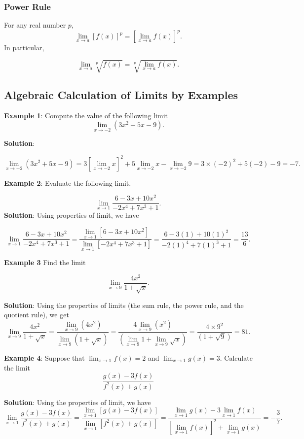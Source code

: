 \documentclass[
]{book}
\begin{document}
\hypertarget{power-rule}{%
\subsubsection{Power Rule}\label{power-rule}}

For any real number \(p\),
\[
\lim_{x\to a}[f(x)]^p = [\lim_{x\to a}f(x)]^p.
\]
In particular,

\[
\lim_{x\to a}\sqrt[p]{f(x)} = \sqrt[p]{\lim_{x\to a}f(x)}.
\]

\hypertarget{algebraic-calculation-of-limits-by-examples}{%
\subsection{Algebraic Calculation of Limits by Examples}\label{algebraic-calculation-of-limits-by-examples}}

\textbf{Example 1}: Compute the value of the following limit
\[
\lim_{x\to -2}(3x^2 + 5x -9).
\]

\textbf{Solution}:

\[
\lim_{x\to -2}(3x^2 + 5x -9) = 3[\lim_{x\to -2} x]^2 + 5\lim_{x\to -2}x - \lim_{x\to -2}9 = 3\times (-2)^2 + 5(-2) - 9 = -7.
\]

\textbf{Example 2}: Evaluate the following limit.

\[
\lim_{x\to 1}\frac{6-3x+10x^2}{-2x^4+7x^3+1}.
\]
\textbf{Solution}: Using properties of limit, we have

\[
\lim_{x\to 1}\frac{6-3x+10x^2}{-2x^4+7x^3+1}=\frac{\lim_{x\to 1}[6-3x+10x^2]}{\lim_{x\to 1}[-2x^4+7x^3+1]}=\frac{6-3(1)+10(1)^2}{-2(1)^4+7(1)^3+1}=\frac{13}{6}.
\]

\textbf{Example 3} Find the limit

\[
\lim_{x\to 9}\frac{4x^2}{1+\sqrt{x}}.
\]

\textbf{Solution}: Using the properties of limits (the sum rule, the power rule, and the quotient rule), we get \[
\lim_{x\to 9}\frac{4x^2}{1+\sqrt{x}}=\frac{\lim_{x\to 9}(4x^2)}{\lim_{x\to 9}(1+\sqrt{x})} = \frac{4\lim_{x\to 9}(x^2)}{(\lim_{x\to 9}1+\lim_{x\to 9}\sqrt{x})} = \frac{4\times 9^2}{(1+\sqrt{9})} = 81.
\]

\textbf{Example 4}: Suppose that \(\lim_{x\to 1}f(x) = 2\) and \(\lim_{x \to 1}g(x) = 3\). Calculate the limit
\[
 \frac{g(x) - 3f(x)}{f^2(x) + g(x)}
 \]

\textbf{Solution}: Using the properties of limit, we have
\[
\lim_{x\to 1} \frac{g(x) - 3f(x)}{f^2(x) + g(x)} =  \frac{\lim_{x\to 1}[g(x) - 3f(x)]}{\lim_{x\to 1}[f^2(x) + g(x)]} = \frac{\lim_{x\to 1}g(x) - 3\lim_{x\to 1}f(x)}{[\lim_{x\to 1}f(x)]^2 + \lim_{x\to 1}g(x)} = -\frac{3}{7}.
\]
\end{document}
